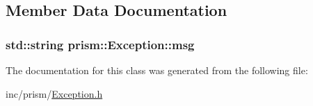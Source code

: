 \subsection{Member Data Documentation}
\subsubsection[{\texorpdfstring{msg}{msg}}]{\setlength{\rightskip}{0pt plus 5cm}std\+::string prism\+::\+Exception\+::msg\hspace{0.3cm}{\ttfamily [protected]}}\hypertarget{classprism_1_1_exception_ab768e96bc8a3f617b3420e19a18caf9f}{}\label{classprism_1_1_exception_ab768e96bc8a3f617b3420e19a18caf9f}


The documentation for this class was generated from the following file\+:\begin{DoxyCompactItemize}
\item 
inc/prism/\hyperlink{_exception_8h}{Exception.\+h}\end{DoxyCompactItemize}
